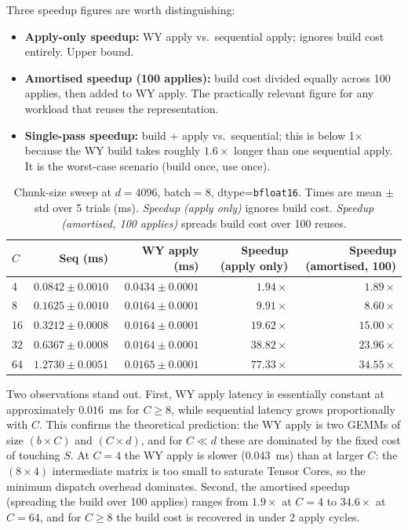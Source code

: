 \documentclass{article} %
\begin{document}
Three speedup figures are worth distinguishing:
\begin{itemize}
  \item \textbf{Apply-only speedup:} WY apply vs.~sequential apply; ignores build cost entirely. Upper bound.
  \item \textbf{Amortised speedup (100 applies):} build cost divided equally across 100 applies, then added to WY apply. The practically relevant figure for any workload that reuses the representation.
  \item \textbf{Single-pass speedup:} build + apply vs.~sequential; this is below 1$\times$ because the WY build takes roughly $1.6\times$ longer than one sequential apply. It is the worst-case scenario (build once, use once).
\end{itemize}

\begin{table}[t]
  \centering
  \caption{Chunk-size sweep at $d=4096$, batch$=8$, dtype=\texttt{bfloat16}. Times are mean $\pm$ std over 5
           trials (ms). \emph{Speedup (apply only)} ignores build cost.
           \emph{Speedup (amortised, 100 applies)} spreads build cost over 100 reuses.}
  \label{tab:sweep-c}
  \begin{tabular}{lrrrr}
    \hline
    $C$ & Seq (ms) & WY apply (ms) & Speedup (apply only) & Speedup (amortised, 100) \\
    \hline
    4  & $0.0842 \pm 0.0010$ & $0.0434 \pm 0.0001$ & $1.94\times$  & $1.89\times$ \\
    8  & $0.1625 \pm 0.0010$ & $0.0164 \pm 0.0001$ & $9.91\times$  & $8.60\times$ \\
    16 & $0.3212 \pm 0.0008$ & $0.0164 \pm 0.0001$ & $19.62\times$ & $15.00\times$ \\
    32 & $0.6367 \pm 0.0008$ & $0.0164 \pm 0.0001$ & $38.82\times$ & $23.96\times$ \\
    64 & $1.2730 \pm 0.0051$ & $0.0165 \pm 0.0001$ & $77.33\times$ & $34.55\times$ \\
    \hline
  \end{tabular}
\end{table}

Two observations stand out. First, WY apply latency is essentially constant at
approximately $0.016$~ms for $C \geq 8$, while sequential latency grows
proportionally with $C$. This confirms the theoretical prediction: the WY apply is
two GEMMs of size $(b \times C)$ and $(C \times d)$, and for $C \ll d$ these are
dominated by the fixed cost of touching $S$. At $C=4$ the WY apply is slower
($0.043$~ms) than at larger $C$: the $(8 \times 4)$ intermediate matrix is too small
to saturate Tensor Cores, so the minimum dispatch overhead dominates. Second, the
amortised speedup (spreading the build over 100 applies) ranges from $1.9\times$ at
$C=4$ to $34.6\times$ at $C=64$, and for $C \geq 8$ the build cost is recovered in
under 2 apply cycles.
\end{document}
